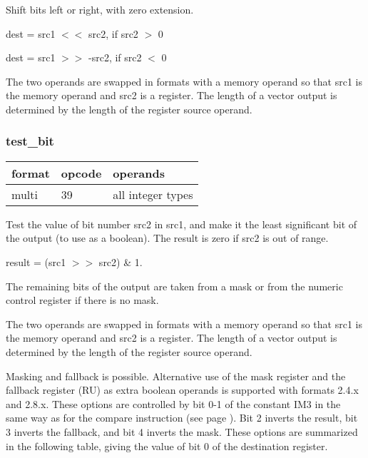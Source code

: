 \documentclass[forwardcom.tex]{subfiles}
\begin{document}
Shift bits left or right, with zero extension.

dest = src1 $<<$ src2, if src2 $>$ 0

dest = src1 $>>$ -src2, if src2 $<$ 0

\vspace{2mm}
The two operands are swapped in formats with a memory operand so that src1 is the memory operand and src2 is a register. The length of a vector output is determined by the length of the register source operand.

\subsubsection{test\_bit}
\label{table:testBitInstruction}
\begin{tabular}{|p{12mm}|p{12mm}|p{110mm}|}
\hline
\bfseries format & \bfseries opcode & \bfseries operands \\ \hline
multi & 39 & all integer types \\ \hline
\end{tabular}
\vspace{2mm}

Test the value of bit number src2 in src1, and make it the least significant bit of the output (to use as a boolean). The result is zero if src2 is out of range.
\vspace{2mm}

result = (src1 $>>$ src2) \& 1.
\vspace{2mm}

The remaining bits of the output are taken from a mask or from the numeric control register if there is no mask. 

\vspace{2mm}
The two operands are swapped in formats with a memory operand so that src1 is the memory operand and src2 is a register. The length of a vector output is determined by the length of the register source operand.

\vspace{2mm}
Masking and fallback is possible. Alternative use of the mask register and the fallback register (RU) as extra boolean operands is supported with formats 2.4.x and 2.8.x. These options are controlled by bit 0-1 of the constant IM3 in the same way as for the compare instruction (see page \pageref{table:AlternativeFallbackForCompare}). Bit 2 inverts the result, bit 3 inverts the fallback, and bit 4 inverts the mask. These options are summarized in the following table, giving the value of bit 0 of the destination register.
\end{document}
